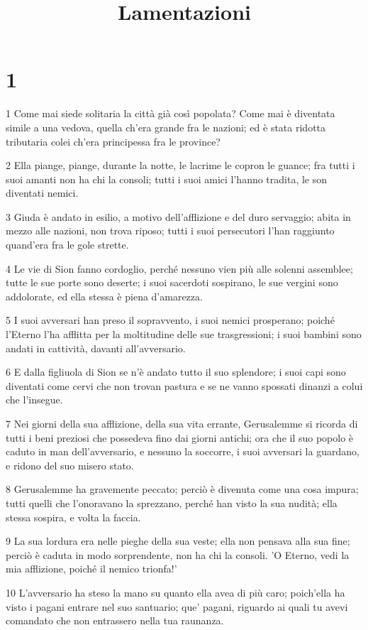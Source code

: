

\title{Lamentazioni}


\chapter{1}

\par 1 Come mai siede solitaria la città già così popolata? Come mai è diventata simile a una vedova, quella ch'era grande fra le nazioni; ed è stata ridotta tributaria colei ch'era principessa fra le province?
\par 2 Ella piange, piange, durante la notte, le lacrime le copron le guance; fra tutti i suoi amanti non ha chi la consoli; tutti i suoi amici l'hanno tradita, le son diventati nemici.
\par 3 Giuda è andato in esilio, a motivo dell'afflizione e del duro servaggio; abita in mezzo alle nazioni, non trova riposo; tutti i suoi persecutori l'han raggiunto quand'era fra le gole strette.
\par 4 Le vie di Sion fanno cordoglio, perché nessuno vien più alle solenni assemblee; tutte le sue porte sono deserte; i suoi sacerdoti sospirano, le sue vergini sono addolorate, ed ella stessa è piena d'amarezza.
\par 5 I suoi avversari han preso il sopravvento, i suoi nemici prosperano; poiché l'Eterno l'ha afflitta per la moltitudine delle sue trasgressioni; i suoi bambini sono andati in cattività, davanti all'avversario.
\par 6 E dalla figliuola di Sion se n'è andato tutto il suo splendore; i suoi capi sono diventati come cervi che non trovan pastura e se ne vanno spossati dinanzi a colui che l'insegue.
\par 7 Nei giorni della sua afflizione, della sua vita errante, Gerusalemme si ricorda di tutti i beni preziosi che possedeva fino dai giorni antichi; ora che il suo popolo è caduto in man dell'avversario, e nessuno la soccorre, i suoi avversari la guardano, e ridono del suo misero stato.
\par 8 Gerusalemme ha gravemente peccato; perciò è divenuta come una cosa impura; tutti quelli che l'onoravano la sprezzano, perché han visto la sua nudità; ella stessa sospira, e volta la faccia.
\par 9 La sua lordura era nelle pieghe della sua veste; ella non pensava alla sua fine; perciò è caduta in modo sorprendente, non ha chi la consoli. 'O Eterno, vedi la mia afflizione, poiché il nemico trionfa!'
\par 10 L'avversario ha steso la mano su quanto ella avea di più caro; poich'ella ha visto i pagani entrare nel suo santuario; que' pagani, riguardo ai quali tu avevi comandato che non entrassero nella tua raunanza.
